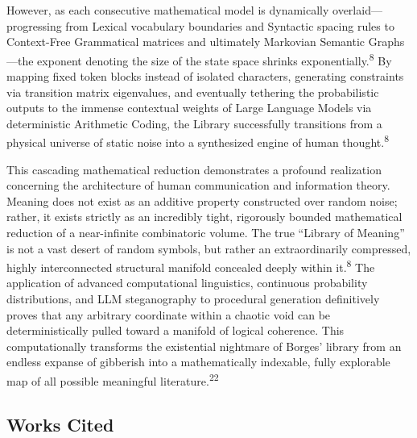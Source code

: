 \documentclass[
  11pt,
  a4paper,
]{article}
\begin{document}
However, as each consecutive mathematical model is dynamically overlaid---progressing from Lexical vocabulary boundaries and Syntactic spacing rules to Context-Free Grammatical matrices and ultimately Markovian Semantic Graphs---the exponent denoting the size of the state space shrinks exponentially.\textsuperscript{8} By mapping fixed token blocks instead of isolated characters, generating constraints via transition matrix eigenvalues, and eventually tethering the probabilistic outputs to the immense contextual weights of Large Language Models via deterministic Arithmetic Coding, the Library successfully transitions from a physical universe of static noise into a synthesized engine of human thought.\textsuperscript{8}

This cascading mathematical reduction demonstrates a profound realization concerning the architecture of human communication and information theory. Meaning does not exist as an additive property constructed over random noise; rather, it exists strictly as an incredibly tight, rigorously bounded mathematical reduction of a near-infinite combinatoric volume. The true ``Library of Meaning'' is not a vast desert of random symbols, but rather an extraordinarily compressed, highly interconnected structural manifold concealed deeply within it.\textsuperscript{8} The application of advanced computational linguistics, continuous probability distributions, and LLM steganography to procedural generation definitively proves that any arbitrary coordinate within a chaotic void can be deterministically pulled toward a manifold of logical coherence. This computationally transforms the existential nightmare of Borges' library from an endless expanse of gibberish into a mathematically indexable, fully explorable map of all possible meaningful literature.\textsuperscript{22}

\subsection{Works Cited}\label{works-cited}
\end{document}
